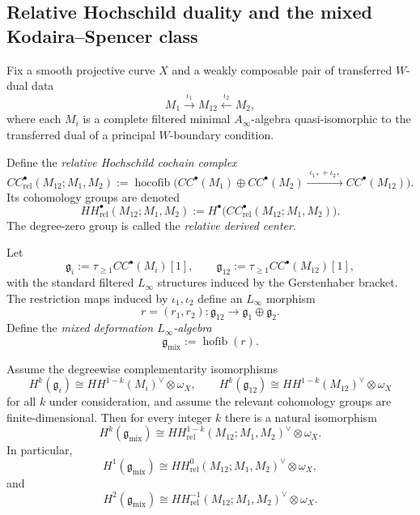 \subsection{Relative Hochschild duality and the mixed Kodaira--Spencer class}
\label{subsec:relative-hochschild-mixed-ks}

Fix a smooth projective curve $X$ and a weakly composable pair of transferred $W$-dual data
\[
M_1 \xrightarrow{\iota_1} M_{12} \xleftarrow{\iota_2} M_2,
\]
where each $M_i$ is a complete filtered minimal $A_\infty$-algebra quasi-isomorphic to the transferred dual of a principal $W$-boundary condition.

\begin{definition}
\label{def:relative-hochschild-cochains}
Define the \emph{relative Hochschild cochain complex}
\[
CC^\bullet_{\mathrm{rel}}(M_{12};M_1,M_2)
:=
\operatorname{hocofib}\!\Big(
CC^\bullet(M_1)\oplus CC^\bullet(M_2)
\xrightarrow{\;\iota_{1*}+\iota_{2*}\;}
CC^\bullet(M_{12})
\Big).
\]
Its cohomology groups are denoted
\[
HH^\bullet_{\mathrm{rel}}(M_{12};M_1,M_2)
:= H^\bullet\big(CC^\bullet_{\mathrm{rel}}(M_{12};M_1,M_2)\big).
\]
The degree-zero group is called the \emph{relative derived center}.
\end{definition}

\begin{definition}
\label{def:mixed-deformation-linfty-relative}
Let
\[
\mathfrak g_i:=\tau_{\ge 1}CC^\bullet(M_i)[1],
\qquad
\mathfrak g_{12}:=\tau_{\ge 1}CC^\bullet(M_{12})[1],
\]
with the standard filtered $L_\infty$ structures induced by the Gerstenhaber bracket.  The restriction maps induced by $\iota_1,\iota_2$ define an $L_\infty$ morphism
\[
r=(r_1,r_2):\mathfrak g_{12}\to \mathfrak g_1\oplus \mathfrak g_2.
\]
Define the \emph{mixed deformation $L_\infty$-algebra}
\[
\mathfrak g_{\mathrm{mix}}:=\operatorname{hofib}(r).
\]
\end{definition}

\begin{theorem}
\label{thm:relative-duality-theorem}
Assume the degreewise complementarity isomorphisms
\[
H^k(\mathfrak g_i)
\cong
HH^{1-k}(M_i)^\vee\otimes \omega_X,
\qquad
H^k(\mathfrak g_{12})
\cong
HH^{1-k}(M_{12})^\vee\otimes \omega_X
\]
for all $k$ under consideration, and assume the relevant cohomology groups are finite-dimensional.  Then for every integer $k$ there is a natural isomorphism
\[
H^k(\mathfrak g_{\mathrm{mix}})
\cong
HH^{1-k}_{\mathrm{rel}}(M_{12};M_1,M_2)^\vee\otimes \omega_X.
\]
In particular,
\[
H^1(\mathfrak g_{\mathrm{mix}})
\cong
HH^{0}_{\mathrm{rel}}(M_{12};M_1,M_2)^\vee\otimes \omega_X,
\]
and
\[
H^2(\mathfrak g_{\mathrm{mix}})
\cong
HH^{-1}_{\mathrm{rel}}(M_{12};M_1,M_2)^\vee\otimes \omega_X.
\]
\end{theorem}

